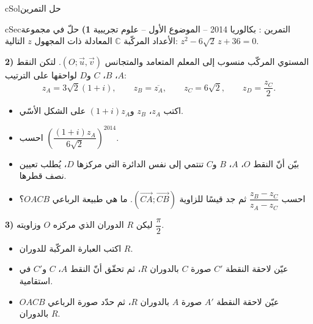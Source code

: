 \documentclass[12pt,a4paper]{article}
\newenvironment{BOX}[2]{\begin{otherlanguage}{english}\begin{arbox}{#1}{#2}}{\end{arbox}\end{otherlanguage}}
\newcounter{exo}
\newenvironment{tamrin}[1]{\stepcounter{exo}\begin{BOX}{cSec}{التمرين \theexo: #1}}{\end{BOX}}
\newenvironment{hal}{\Needspace{12\baselineskip}\begin{otherlanguage}{english}\begin{arbox}[breakable]{cSol}{حل التمرين \theexo}}{\end{arbox}\end{otherlanguage}}
\newenvironment{LTR}{\begin{otherlanguage}{english}}{\end{otherlanguage}}
\newenvironment{sq}{\begin{itemize}[leftmargin=2.4em,itemsep=3pt]}{\end{itemize}}
\newcommand{\qa}{\item[(أ)]}\newcommand{\qb}{\item[(ب)]}\newcommand{\qc}{\item[(جـ)]}\newcommand{\qd}{\item[(د)]}\newcommand{\qe}{\item[(هـ)]}
\begin{document}
\begin{hal}
\begin{center}\begin{LTR}\end{LTR}\end{center}
\end{hal}

\begin{tamrin}{بكالوريا 2014 -- الموضوع الأول -- علوم تجريبية}
\textbf{1)} حلّ في مجموعة الأعداد المركّبة $\mathbb{C}$ المعادلة ذات المجهول $z$ التالية: $z^2-6\sqrt2\,z+36=0$.

\textbf{2)} المستوي المركّب منسوب إلى المعلم المتعامد والمتجانس $(O;\vec u,\vec v)$. لتكن النقط $A$، $B$، $C$ و$D$ لواحقها على الترتيب:
\[z_A=3\sqrt2(1+i),\qquad z_B=\overline{z_A},\qquad z_C=6\sqrt2,\qquad z_D=\frac{z_C}{2}.\]
\begin{sq}
\qa اكتب $z_A$، $z_B$ و$(1+i)z_A$ على الشكل الأسّي.
\qb احسب $\left(\dfrac{(1+i)z_A}{6\sqrt2}\right)^{2014}$.
\qc بيّن أنّ النقط $O$، $A$، $B$ و$C$ تنتمي إلى نفس الدائرة التي مركزها $D$، يُطلب تعيين نصف قطرها.
\qd احسب $\dfrac{z_B-z_C}{z_A-z_C}$ ثم جد قيسًا للزاوية $(\overrightarrow{CA};\overrightarrow{CB})$. ما هي طبيعة الرباعي $OACB$؟
\end{sq}
\textbf{3)} ليكن $R$ الدوران الذي مركزه $O$ وزاويته $\dfrac{\pi}{2}$.
\begin{sq}
\qa اكتب العبارة المركّبة للدوران $R$.
\qb عيّن لاحقة النقطة $C'$ صورة $C$ بالدوران $R$، ثم تحقّق أنّ النقط $A$، $C$ و$C'$ في استقامية.
\qc عيّن لاحقة النقطة $A'$ صورة $A$ بالدوران $R$، ثم حدّد صورة الرباعي $OACB$ بالدوران $R$.
\end{sq}
\end{tamrin}
\end{document}
